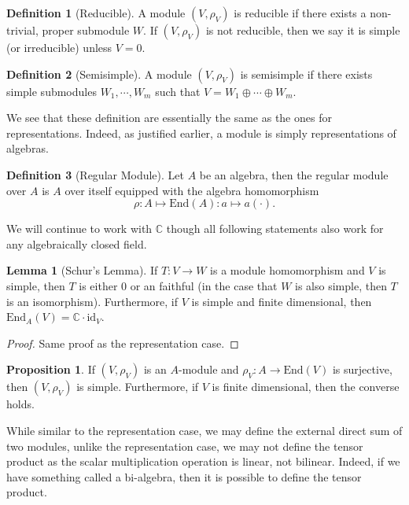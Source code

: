 \documentclass[]{article}
\theoremstyle{definition}
\theoremstyle{definition}
\newtheorem{definition}{Definition}[section]
\newtheorem{lemma}{Lemma}[section]
\newtheorem{proposition}{Proposition}[section]
\begin{document}
\begin{definition}[Reducible]
  A module \((V, \rho_V)\) is reducible if there exists a non-trivial, proper 
  submodule \(W\). If \((V, \rho_V)\) is not reducible, then we say it is 
  simple (or irreducible) unless \(V = 0\).
\end{definition}

\begin{definition}[Semisimple]
  A module \((V, \rho_V)\) is semisimple if there exists simple submodules 
  \(W_1, \cdots, W_m\) such that \(V = W_1 \oplus \cdots \oplus W_m\). 
\end{definition}

We see that these definition are essentially the same as the ones for 
representations. Indeed, as justified earlier, a module is simply  
representations of algebras.

\begin{definition}[Regular Module]
  Let \(A\) be an algebra, then the regular module over \(A\) is \(A\) over 
  itself equipped with the algebra homomorphism 
  \[\rho : A \mapsto \text{End}(A) : a \mapsto a (\cdot).\]
\end{definition}

We will continue to work with \(\mathbb{C}\) though all following statements also 
work for any algebraically closed field.

\begin{lemma}[Schur's Lemma]
  If \(T : V \to W\) is a module homomorphism and \(V\) is simple, then 
  \(T\) is either 0 or an faithful (in the case that 
  \(W\) is also simple, then \(T\) is an isomorphism). Furthermore, if 
  \(V\) is simple and finite dimensional, then 
  \(\text{End}_A(V) = \mathbb{C} \cdot \text{id}_V\).
\end{lemma}
\begin{proof}
  Same proof as the representation case.
\end{proof}

\begin{proposition}
  If \((V, \rho_V)\) is an \(A\)-module and \(\rho_V : A \to \text{End}(V)\) is 
  surjective, then \((V, \rho_V)\) is simple. Furthermore, if \(V\) is 
  finite dimensional, then the converse holds.
\end{proposition}

While similar to the representation case, we may define the external direct sum of 
two modules, unlike the representation case, we may not define the tensor product 
as the scalar multiplication operation is linear, not bilinear. Indeed, if we 
have something called a bi-algebra, then it is possible to define the tensor 
product.
\end{document}
